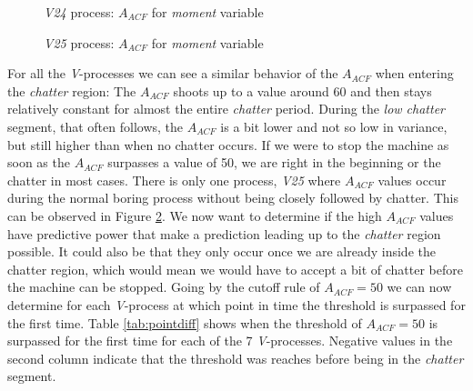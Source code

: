 \documentclass[12 pt]{scrartcl}
\begin{document}
\begin{figure}[p]
  \caption{\emph{V24} process: $A_{ACF}$ for \emph{moment} variable}
  \label{fig:v24-moment-aacf}
\end{figure}


\begin{figure}[p]
  \caption{\emph{V25} process: $A_{ACF}$ for \emph{moment} variable}
  \label{fig:v25-moment-aacf}
\end{figure}

For all the \emph{V}-processes we can see a similar behavior of the $A_{ACF}$ when entering the \emph{chatter} region: The $A_{ACF}$ shoots up to a value around 60 and then stays relatively constant for almost the entire \emph{chatter} period. During the \emph{low chatter} segment, that often follows, the $A_{ACF}$ is a bit lower and not so low in variance, but still higher than when no chatter occurs. If we were to stop the machine as soon as the $A_{ACF}$ surpasses a value of 50, we are right in the beginning or the chatter in most cases. There is only one process, \emph{V25} where $A_{ACF}$ values occur during the normal boring process without being closely followed by chatter. This can be observed in Figure \ref{fig:v25-moment-aacf}.
We now want to determine if the high $A_{ACF}$ values have predictive power that make a prediction leading up to the \emph{chatter} region possible. It could also be that they only occur once we are already inside the chatter region, which would mean we would have to accept a bit of chatter before the machine can be stopped.
Going by the cutoff rule of $A_{ACF} = 50$ we can now determine for each \emph{V}-process at which point in time the threshold is surpassed for the first time.
Table \ref{tab:pointdiff} shows when the threshold of $A_{ACF} = 50$ is surpassed for the first time for each of the 7 \emph{V}-processes. Negative values in the second column indicate that the threshold was reaches before being in the \emph{chatter} segment.
\end{document}
